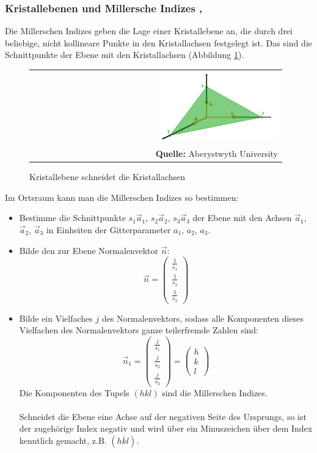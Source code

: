 \documentclass[a4paper,titlepage]{scrartcl}
\numberwithin{equation}{section}
\begin{document}
\subsubsection{Kristallebenen und Millersche Indizes \cite{wiki:miller}, \cite{kittel}}
Die Millerschen Indizes geben die Lage einer Kristallebene an, die durch drei beliebige, nicht kollineare Punkte in den Kristallachsen festgelegt ist. Das sind die Schnittpunkte der Ebene mit den Kristallachsen (Abbildung \ref{fig:miller}).
\begin{figure}[H]
	\centering
	\begin{tabular}{@{}r@{}}
		\includegraphics[width=0.5\textwidth]{bravaismiller.png}\\
		\footnotesize\sffamily\textbf{Quelle:} Aberystwyth University \cite{miller}
	\end{tabular}
	\caption{Kristallebene schneidet die Kristallachsen}
    \label{fig:miller}
\end{figure}
Im Ortsraum kann man die Millerschen Indizes so bestimmen:
\begin{itemize}
\item Bestimme die Schnittpunkte $s_1 \vec{a}_1$, $s_2 \vec{a}_2$, $s_3 \vec{a}_3$ der Ebene mit den Achsen $\vec{a}_1$, $\vec{a}_2$, $\vec{a}_3$ in Einheiten der Gitterparameter $a_1$, $a_2$, $a_3$.
\item Bilde den zur Ebene Normalenvektor $\vec{n}$:
\begin{equation*}
\vec{n}=\begin{pmatrix}\frac{1}{s_1}\\\frac{1}{s_2}\\\frac{1}{s_3}\end{pmatrix}
\end{equation*}
\item Bilde ein Vielfaches $j$ des Normalenvektors, sodass alle Komponenten dieses Vielfachen des Normalenvektors ganze teilerfremde Zahlen sind:
\begin{equation*}
\vec{n}_1=\begin{pmatrix}\frac{j}{s_1}\\\frac{j}{s_2}\\\frac{j}{s_3}\end{pmatrix}=\begin{pmatrix}h\\k\\l\end{pmatrix}
\end{equation*}
Die Komponenten des Tupels $(hkl)$ sind die Millerschen Indizes.\\ \\
Schneidet die Ebene eine Achse auf der negativen Seite des Ursprungs, so ist der zugehörige Index negativ und wird über ein Minuszeichen über dem Index kenntlich gemacht, z.B. $(h\overline{k}l)$.
\end{itemize}
\end{document}

